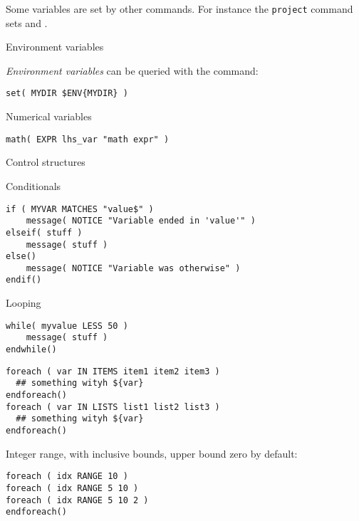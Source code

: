 Some variables are set by other commands.
For instance the \texttt{project} command sets
 and .

 {Environment variables}

\emph{Environment variables}
can be queried with the  command:
\begin{lstlisting}
set( MYDIR $ENV{MYDIR} )
\end{lstlisting}

 {Numerical variables}

\begin{lstlisting}
math( EXPR lhs_var "math expr" )
\end{lstlisting}

 {Control structures}

 {Conditionals}

\begin{lstlisting}
if ( MYVAR MATCHES "value$" )
    message( NOTICE "Variable ended in 'value'" )
elseif( stuff )
    message( stuff )
else()
    message( NOTICE "Variable was otherwise" )
endif()
\end{lstlisting}

 {Looping}

\begin{lstlisting}
while( myvalue LESS 50 )
    message( stuff )
endwhile()
\end{lstlisting}

\begin{lstlisting}
foreach ( var IN ITEMS item1 item2 item3 )
  ## something wityh ${var}
endforeach()
foreach ( var IN LISTS list1 list2 list3 )
  ## something wityh ${var}
endforeach()
\end{lstlisting}

Integer range, with inclusive bounds, upper bound zero by default:
\begin{lstlisting}
foreach ( idx RANGE 10 )
foreach ( idx RANGE 5 10 )
foreach ( idx RANGE 5 10 2 )
endforeach()
\end{lstlisting}






